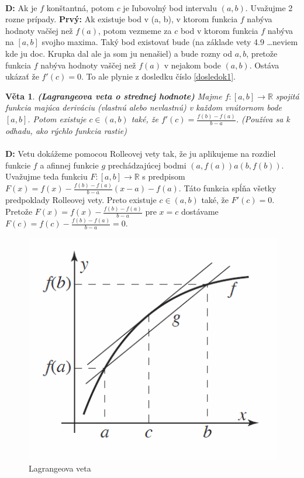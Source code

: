 \documentclass[12pt,a4paper]{article}
\newtheorem{sentence}{Věta}
\begin{document}
\paragraph{}
\textbf{D:} Ak je $f$ konštantná, potom $c$ je ľubovolný bod intervalu $(a, b)$. Uvažujme 2 rozne prípady. \textbf{Prvý:} Ak existuje bod v (a, b), v ktorom funkcia $f$ nabýva hodnoty vačšej než $f(a)$, potom vezmeme za $c$ bod v ktorom funkcia $f$ nabýva na $[a, b]$ svojho maxima. Taký bod existovať bude (na základe vety 4.9 \dots neviem kde ju doc. Krupka dal ale ja som ju nenašiel) a bude rozny od $a, b$, pretože funkcia $f$ nabýva hodnoty vaščej než $f(a)$ v nejakom bode $(a, b)$. Ostáva ukázať že $f'(c)=0$. To ale plynie z dosledku číslo \ref{dosledok1}.

\begin{sentence}
	\textbf{\textbf{(Lagrangeova veta o strednej hodnote)}} Majme $f:[a,b]\rightarrow \mathds{R}$ spojitá funkcia majúca deriváciu (vlastnú alebo nevlastnú) v každom vnútornom bode $[a,b]$. Potom existuje $c\in (a, b)$ také, že $f'(c)=\frac{f(b)-f(a)}{b-a}$. (Používa sa k odhadu, ako rýchlo funkcia rastie)
\end{sentence}

\paragraph{}
\textbf{D:} Vetu dokážeme pomocou Rolleovej vety tak, že ju aplikujeme na rozdiel funkcie $f$ a afinnej funkcie $g$ prechádzajúcej bodmi $(a, f(a)) a (b, f(b))$. Uvažujme teda funkciu $F:[a, b]\rightarrow \mathds{R}$ s predpisom $F(x)=f(x)-\frac{f(b)-f(a)}{b-a}(x-a)-f(a)$. Táto funkcia spĺňa všetky predpoklady Rolleovej vety. Preto existuje $c\in (a, b)$ také, že $F'(c)=0$. Pretože $F(x)=f(x)-\frac{f(b)-f(a)}{b-a}$ pre $x=c$ dostávame $F(c)=f(c)-\frac{f(b)-f(a)}{b-a}=0$.

\begin{figure}[H]
	\begin{center}
		\includegraphics[scale=0.6]{img/lagrangeova_veta}
	\end{center}
	\caption{Lagrangeova veta}
\end{figure}
\end{document}
